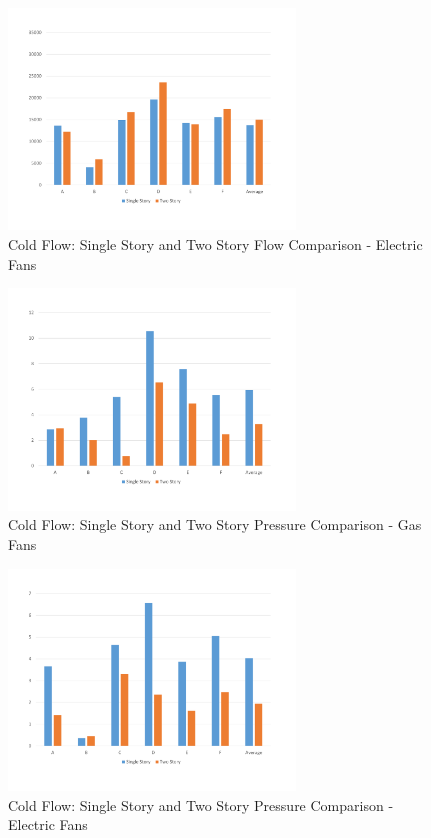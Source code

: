 \documentclass{article}
\begin{document}
\begin{figure}[H]
	\centering
	\includegraphics[width=3in]{0_Images/ColdFlow/Ele_Flow.pdf}
	\caption{Cold Flow: Single Story and Two Story Flow Comparison - Electric Fans}
	\label{fig:SingleTwoCompEleFlow}
\end{figure}

\begin{figure}[H]
	\centering
	\includegraphics[width=3in]{0_Images/ColdFlow/Gas_Press.pdf}
	\caption{Cold Flow: Single Story and Two Story Pressure Comparison - Gas Fans}
	\label{fig:SingleTwoCompGasPress}
\end{figure}

\begin{figure}[H]
	\centering
	\includegraphics[width=3in]{0_Images/ColdFlow/Ele_Press.pdf}
	\caption{Cold Flow: Single Story and Two Story Pressure Comparison - Electric Fans}
	\label{fig:SingleTwoCompElePress}
\end{figure}
\end{document}
